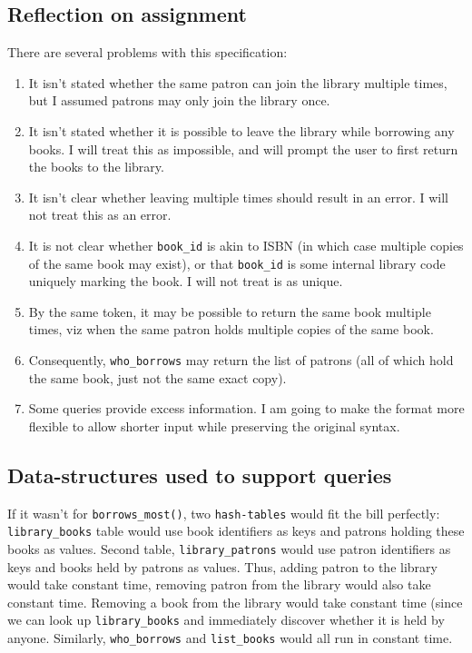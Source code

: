 \documentclass[11pt]{article}
\begin{document}
\subsection{Reflection on assignment}
\label{sec-2-1}
There are several problems with this specification:
\begin{enumerate}
\item It isn't stated whether the same patron can join the library multiple
times, but I assumed patrons may only join the library once.
\item It isn't stated whether it is possible to leave the library while
borrowing any books.  I will treat this as impossible, and will prompt the
user to first return the books to the library.
\item It isn't clear whether leaving multiple times should result in an error.
I will not treat this as an error.
\item It is not clear whether \texttt{book\_id} is akin to ISBN (in which case multiple
copies of the same book may exist), or that \texttt{book\_id} is some internal
library code uniquely marking the book.  I will not treat is as unique.
\item By the same token, it may be possible to return the same book multiple
times, viz when the same patron holds multiple copies of the same book.
\item Consequently, \texttt{who\_borrows} may return the list of patrons (all of which
hold the same book, just not the same exact copy).
\item Some queries provide excess information.  I am going to make the format
more flexible to allow shorter input while preserving the original syntax.
\end{enumerate}

\subsection{Data-structures used to support queries}
\label{sec-2-2}
If it wasn't for \texttt{borrows\_most()}, two \texttt{hash-tables} would fit the bill
perfectly: \texttt{library\_books} table would use book identifiers as keys and
patrons holding these books as values.  Second table, \texttt{library\_patrons} would
use patron identifiers as keys and books held by patrons as values.  Thus,
adding patron to the library would take constant time, removing patron from
the library would also take constant time.  Removing a book from the library
would take constant time (since we can look up \texttt{library\_books} and
immediately discover whether it is held by anyone.  Similarly, \texttt{who\_borrows}
and \texttt{list\_books} would all run in constant time.
\end{document}
